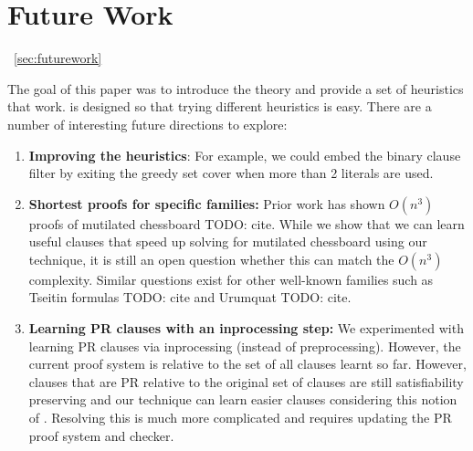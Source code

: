 \section{Future Work}~\ref{sec:futurework}

The goal of this paper was to introduce the theory and provide a set of
heuristics that work. \tool is designed so that trying different heuristics
is easy. There are a number of interesting future directions to explore:

\begin{enumerate}
    \item \textbf{Improving the heuristics}: For example, we could embed the
    binary clause filter by exiting the greedy set cover when more than 2
    literals are used.
    \item \textbf{Shortest proofs for specific families:} Prior work has shown $O(n^3)$ \pr proofs of mutilated chessboard TODO: cite.  While we show that we can learn useful clauses that speed up solving for mutilated chessboard using our technique, it is still an open question whether this can match the $O(n^3)$ complexity. Similar questions exist for other well-known families such as Tseitin formulas TODO: cite and Urumquat TODO: cite.
    \item \textbf{Learning PR clauses with an inprocessing step:} We experimented with learning PR clauses via inprocessing (instead of preprocessing). However, the current \pr proof system is \pr relative to the set of all clauses learnt so far. However, clauses that are PR relative to the original set of clauses are still satisfiability preserving and our technique can learn easier clauses considering this notion of \pr. Resolving this is much more complicated and requires updating the PR proof system and checker.
\end{enumerate}